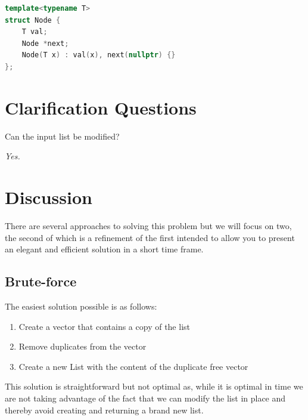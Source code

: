 \begin{lstlisting}[language=c++, caption=Singly Linked list definition,label=list:delete_duplicates_list:linked_list]
template<typename T>
struct Node {
	T val;
	Node *next;
	Node(T x) : val(x), next(nullptr) {}
};
\end{lstlisting}

\section{Clarification Questions}

\begin{QandA}
	\item \begin{questionitem} \begin{question} Can the input list be modified?  \end{question} 	 
    \begin{answered}
		\textit{Yes.}
	\end{answered} \end{questionitem}
	
\end{QandA}

\section{Discussion}
\label{delete_duplicates_list:sec:discussion}
There are several approaches to solving this problem but we will focus on two, the second of which is a refinement of the first intended to allow you to present an elegant and efficient solution in a short time frame.

\subsection{Brute-force}
\label{delete_duplicates_list:sec:bruteforce}
The easiest solution possible is as follows:
\begin{enumerate}
	\item Create a vector that contains a copy of the list
	\item Remove duplicates from the vector
	\item Create a new List with the content of the duplicate free vector
\end{enumerate}
This solution is straightforward but not optimal as, while it is optimal in time we are not taking advantage of the fact that we can modify the list in place and thereby avoid creating and returning a brand new list.  

